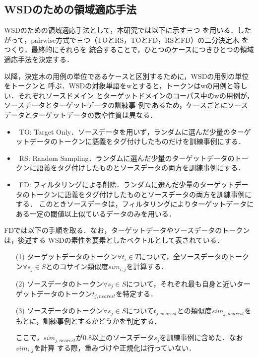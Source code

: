 \documentclass[japanese]{jnlp_1.4}
\begin{document}
\subsection{WSDのための領域適応手法}
\label{sec:item17}

WSDのための領域適応手法として，本研究では以下に示す三つ
を用いる．したがって，pairwise方式で三つ（TOとRS，TOとFD，RSとFD）の二分決定木
をつくり，最終的にそれらを
統合することで，ひとつのケースにつきひとつの領域適応手法を決定する．

以降，決定木の用例の単位であるケースと区別するために，WSDの用例の単位をトークンと
呼ぶ．WSDの対象単語をwとすると，トークンはwの用例と等しい．それぞれソースドメイン
とターゲットドメインのコーパス中のwの用例が，ソースデータとターゲットデータの訓練事
例であるため，ケースごとにソースデータとターゲットデータの数や性質は異なる．

\begin{itemize}
\item\ TO: Target Only．ソースデータを用いず，ランダムに選んだ少量のターゲットデータのトークンに語義をタグ付けしたものだけを訓練事例にする．
\item\ RS: Random Sampling．ランダムに選んだ少量のターゲットデータのトークンに語義をタグ付けしたものとソースデータの両方を訓練事例にする．
\item\ FD: フィルタリングによる削除．ランダムに選んだ少量のターゲットデータのトークンに語義をタグ付けしたものとソースデータの両方を訓練事例にする．
このときソースデータは，フィルタリングによりターゲットデータにある一定の閾値以上似ているデータのみを用いる．
\end{itemize}

FDでは以下の手順を取る．なお，ターゲットデータやソースデータのトークンは，後述する
WSDの素性を要素としたベクトルとして表されている．

\begin{itemize}
\item[(1)] ターゲットデータのトークン$\forall t_{i}\in T$について，全ソースデータのトークン$\forall s_{j}\in S$とのコサイン類似度$sim_{i,j}$を計算する．
\item[(2)] ソースデータのトークン$\forall s_{j}\in S$について，それぞれ最も自身と近いターゲットデータのトークン$ t_{j,nearest}$を特定する．
\item[(3)] ソースデータのトークン$\forall s_{j}\in S$について$t_{j,nearest}$との類似度$sim_{j,nearest}$をもとに，訓練事例とするかどうかを判定する．

ここで，$sim_{j,nearest}$が0.8以上のソースデータ$s_{j}$を訓練事例に含めた．なお$sim_{i,j}$を計算
する際，重みづけや正規化は行っていない．
\end{itemize}
\end{document}
